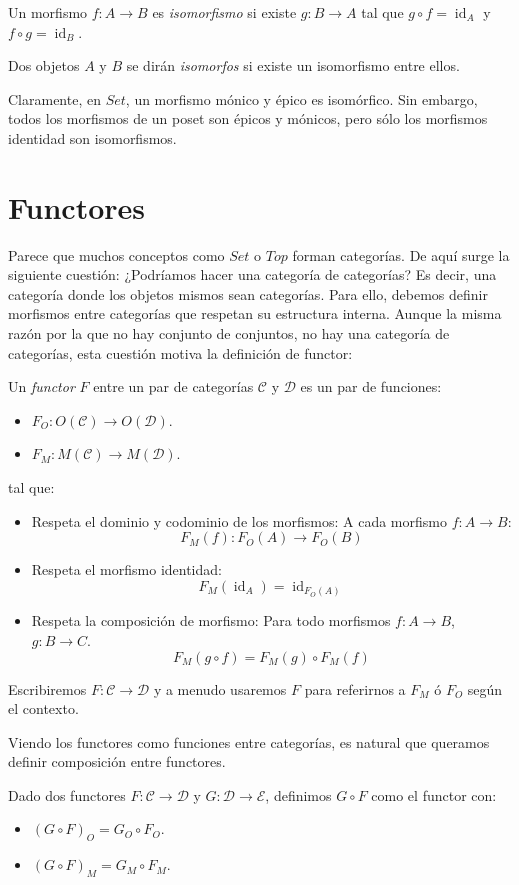\documentclass[12pt, twoside]{book}
\newcommand{\newterm}[1]{\index{#1}\emph{#1}}
\newcommand{\cat}{{\mathcal{C}}}
\newcommand{\Set}{{Set}}
\newcommand{\Top}{{Top}}
\DeclareMathOperator{\id}{id}
\begin{document}
\begin{definition}
Un morfismo $f \colon A \to B$ es \newterm{isomorfismo} si existe $g \colon B \to A$ tal que $g \circ f = \id_A$ y $f \circ g = \id_B$.

Dos objetos $A$ y $B$ se dirán \emph{isomorfos} si existe un isomorfismo entre ellos.
\end{definition}

Claramente, en $\Set$, un morfismo mónico y épico es isomórfico.
Sin embargo, todos los morfismos de un poset son épicos y mónicos, pero sólo los morfismos identidad son isomorfismos.

\section{Functores}
Parece que muchos conceptos como $\Set$ o $\Top$ forman categorías.
De aquí surge la siguiente cuestión: ¿Podríamos hacer una categoría de categorías?
Es decir, una categoría donde los objetos mismos sean categorías.
Para ello, debemos definir morfismos entre categorías que respetan su estructura interna.
Aunque la misma razón por la que no hay conjunto de conjuntos, no hay una categoría de categorías, esta cuestión motiva la definición de functor:

\begin{definition}\label{def:functor}
Un \newterm{functor} $F$ entre un par de categorías $\cat$ y $\mathcal{D}$ es un par de funciones:
\begin{itemize}
\item $F_O : O(\cat) \to O(\mathcal{D})$.
\item $F_M : M(\cat) \to M(\mathcal{D})$.
\end{itemize}
tal que:
\begin{itemize}
\item Respeta el dominio y codominio de los morfismos: A cada morfismo $f : A \to B$:
\[ F_M(f) : F_O(A) \to F_O(B) \]
\item Respeta el morfismo identidad:
\[ F_M(\id_A) = \id_{F_O(A)} \]
\item Respeta la composición de morfismo: Para todo morfismos $f : A \to B$, $g : B \to C$.
\[ F_M(g \circ f) = F_M(g) \circ F_M(f) \]
\end{itemize}
\end{definition}

Escribiremos $F \colon \cat \to \mathcal{D}$ y a menudo usaremos $F$ para referirnos a $F_M$ ó $F_O$ según el contexto.

Viendo los functores como funciones entre categorías, es natural que queramos definir composición entre functores.
\begin{definition}
Dado dos functores $F \colon \cat \to \mathcal{D}$ y $G \colon \mathcal{D} \to \mathcal{E}$, definimos $G \circ F$ como el functor con:
\begin{itemize}
  \item $(G \circ F)_O = G_O \circ F_O$.
  \item $(G \circ F)_M = G_M \circ F_M$.
\end{itemize}
\end{definition}
\end{document}

